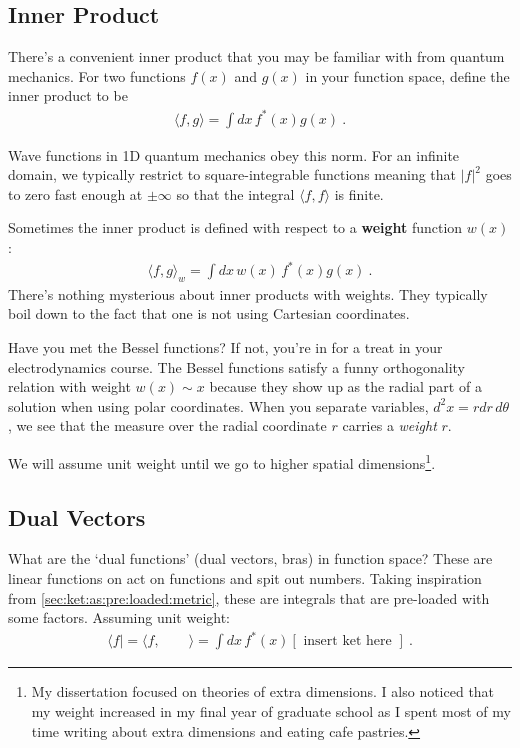\subsection{Inner Product}

There's a convenient inner product that you may be familiar with from quantum mechanics. For two functions $f(x)$ and $g(x)$ in your function space, define the inner product to be
\begin{align}
	\langle f,g\rangle 
	=
	\int dx\, f^*(x)g(x) \ .
	\label{eq:L2:inner:product}
\end{align}
\begin{example}
Wave functions in 1D quantum mechanics obey this norm. For an infinite domain, we typically restrict to square-integrable functions meaning that $|f|^2$ goes to zero fast enough at $\pm \infty$ so that the integral $\langle f, f\rangle$ is finite. 
\end{example}
Sometimes the inner product is defined with respect to a \textbf{weight} function $w(x)$:
\begin{align}
	\langle f,g\rangle_w 
	=
	\int dx\, w(x)\, f^*(x)g(x) \ .
	\label{eq:weighted:inner:product}
\end{align}
There's nothing mysterious about inner products with weights. They typically boil down to the fact that one is not using Cartesian coordinates. 
\begin{example}
Have you met the Bessel functions? If not, you're in for a treat in your electrodynamics course. The Bessel functions satisfy a funny orthogonality relation with weight $w(x)\sim x$ because they show up as the radial part of a solution when using polar coordinates. When you separate variables, $d^2x = rdr\,d\theta$, we see that the measure over the radial coordinate $r$ carries a \emph{weight} $r$.
\end{example}
We will assume unit weight until we go to higher spatial dimensions\footnote{My dissertation focused on theories of extra dimensions. I also noticed that my weight increased in my final year of graduate school as I spent most of my time writing about extra dimensions and eating cafe pastries.}.

\subsection{Dual Vectors}

What are the `dual functions' (dual vectors, bras) in function space? These are linear functions on act on functions and spit out numbers. Taking inspiration from \eqref{sec:ket:as:pre:loaded:metric}, these are integrals that are pre-loaded with some factors. Assuming unit weight:
\begin{align}
	\langle f | = \langle f, \qquad \rangle
	= 
	\int dx \, f^*(x) \left[\text{ insert ket here }\right] \ .
\end{align}


